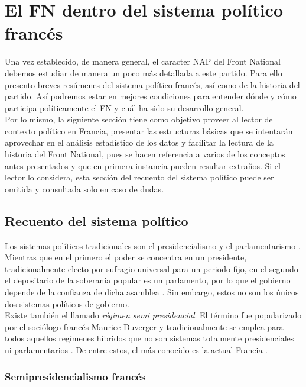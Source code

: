 \chapter{El FN dentro del sistema político francés}

Una vez establecido, de manera general, el caracter NAP del Front National debemos estudiar de manera un poco más detallada a este partido. Para ello presento breves resúmenes del sistema político francés, así como de la historia del partido. Así podremos estar en mejores condiciones para entender dónde y cómo participa políticamente el FN y cuál ha sido su desarrollo general.\\

{\color{Red} Por lo mismo, la siguiente sección tiene como objetivo proveer al lector del contexto político en Francia, presentar las estructuras básicas que se intentarán aprovechar en el análisis estadístico de los datos y facilitar la lectura de la historia del Front National, pues se hacen referencia a varios de los conceptos antes presentados y que en primera instancia pueden resultar extraños. Si el lector lo considera, esta sección del recuento del sistema político puede ser omitida y consultada solo en caso de dudas.}

\section{Recuento del sistema político}

Los sistemas políticos tradicionales son el presidencialismo y el parlamentarismo \parencites{Carpizo04}{Veser99}. Mientras que en el primero el poder se concentra en un presidente, tradicionalmente electo por sufragio universal para un periodo fijo, en el segundo el depositario de la soberanía popular es un parlamento, por lo que el gobierno depende de la confianza de dicha asamblea \parencite{Linz90}. Sin embargo, estos no son los únicos dos sistemas políticos de gobierno.\\ 

Existe también el llamado \textit{régimen semi presidencial}. El término fue popularizado por el sociólogo francés Maurice Duverger y tradicionalmente se emplea para todos aquellos regímenes híbridos que no son sistemas totalmente  presidenciales ni parlamentarios \parencites{Veser99}{Carpizo04}{Linz90}. De entre estos, el más conocido es la actual Francia \parencite{Carpizo04}.\\

\subsection{Semipresidencialismo francés}

